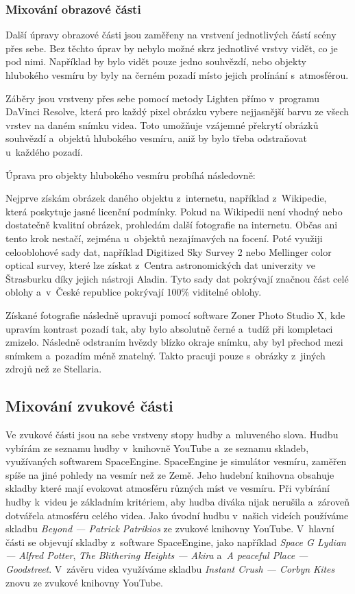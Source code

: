 \documentclass[12pt,a4paper,titlepage]{article}
\begin{document}
\subsubsection{Mixování obrazové části}
Další úpravy obrazové části jsou zaměřeny na vrstvení jednotlivých částí scény přes sebe. Bez těchto úprav by nebylo možné skrz jednotlivé vrstvy vidět, co je pod nimi. Například by bylo vidět pouze jedno souhvězdí, nebo objekty hlubokého vesmíru by byly na černém pozadí místo jejich prolínání s~atmosférou.

Záběry jsou vrstveny přes sebe pomocí metody Lighten přímo v~programu DaVinci Resolve, která pro každý pixel obrázku vybere nejjasnější barvu ze všech vrstev na daném snímku videa. Toto umožňuje vzájemné překrytí obrázků souhvězdí a~objektů hlubokého vesmíru, aniž by bylo třeba odstraňovat u~každého pozadí. 

Úprava pro objekty hlubokého vesmíru probíhá následovně:

Nejprve získám obrázek daného objektu z~internetu, například z~Wikipedie, která poskytuje jasné licenční podmínky. Pokud na Wikipedii není vhodný nebo dostatečně kvalitní obrázek, prohledám další fotografie na internetu. Občas ani tento krok nestačí, zejména u~objektů nezajímavých na focení. Poté využiji celooblohové sady dat, například Digitized Sky Survey 2 nebo Mellinger color optical survey, které lze získat z~Centra astronomických dat univerzity ve Štrasburku díky jejich nástroji Aladin. Tyto sady dat pokrývají značnou část celé oblohy a~v~České republice pokrývají 100\% viditelné oblohy. 

Získané fotografie následně upravuji pomocí software Zoner Photo Studio X, kde upravím kontrast pozadí tak, aby bylo absolutně černé a~tudíž při kompletaci zmizelo. Následně odstraním hvězdy blízko okraje snímku, aby byl přechod mezi snímkem a~pozadím méně znatelný. Takto pracuji pouze s~obrázky z~jiných zdrojů než ze Stellaria.
\subsection{Mixování zvukové části}
Ve zvukové části jsou na sebe vrstveny stopy hudby a~mluveného slova. Hudbu vybírám ze seznamu hudby v~knihovně YouTube a~ze seznamu skladeb, využívaných softwarem SpaceEngine. SpaceEngine je simulátor vesmíru, zaměřen spíše na jiné pohledy na vesmír než ze Země. Jeho hudební knihovna obsahuje skladby které mají evokovat atmosféru různých míst ve vesmíru. Při vybírání hudby k~videu je základním kritériem, aby hudba diváka nijak nerušila a~zároveň dotvářela atmosféru celého videa. Jako úvodní hudbu v~našich videích používáme skladbu \textit{Beyond --- Patrick Patrikios} ze zvukové knihovny YouTube. V~hlavní části se objevují skladby z~software SpaceEngine, jako například \textit{Space G Lydian --- Alfred Potter}, \textit{The Blithering Heights --- Akira} a~\textit{A peaceful Place --- Goodstreet}. V~závěru videa využíváme skladbu \textit{Instant Crush --- Corbyn Kites} znovu ze zvukové knihovny YouTube.
\end{document}
